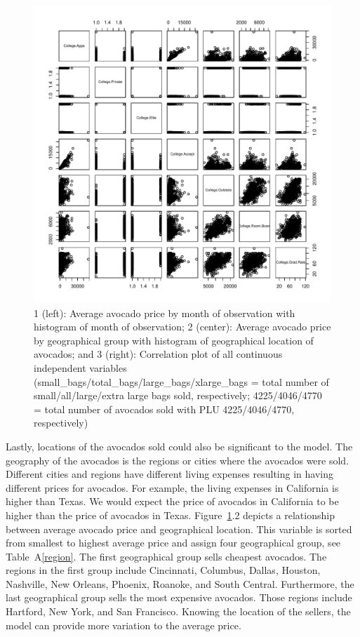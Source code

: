 \documentclass[11pt]{article}\usepackage[]{graphicx}\usepackage[]{color}
\makeatletter
\def\maxwidth{ %
  \ifdim\Gin@nat@width>\linewidth
    \linewidth
  \else
    \Gin@nat@width
  \fi
}
\makeatother
\begin{document}
\begin{figure}[h!] 
\begin{center}

\includegraphics[width=\maxwidth]{figure/unnamed-chunk-2-1} 

\caption{1 (left): Average avocado price by month of observation with histogram of month of observation; 2 (center): Average avocado price by geographical group with histogram of geographical location of avocados; and 3 (right): Correlation plot of all continuous independent variables (small\_bags/total\_bags/large\_bags/xlarge\_bags = total number of small/all/large/extra large bags sold, respectively; 4225/4046/4770 = total number of avocados sold with PLU 4225/4046/4770, respectively)}
\label{explore2}
\end{center} 
\end{figure}

\noindent Lastly, locations of the avocados sold could also be significant to the model. The geography of the avocados is the regions or cities where the avocados were sold. Different cities and regions have different living expenses resulting in having different prices for avocados. For example, the living expenses in California is higher than Texas. We would expect the price of avocados in California to be higher than the price of avocados in Texas. Figure~\ref{explore2}.2 depicts a relationship between average avocado price and geographical location. This variable is sorted from smallest to highest average price and assign four geographical group, see Table~A\ref{region}. The first geographical group sells cheapest avocados. The regions in the first group include Cincinnati, Columbus, Dallas, Houston, Nashville, New Orleans, Phoenix, Roanoke, and South Central. Furthermore, the last geographical group sells the most expensive avocados. Those regions include Hartford, New York, and San Francisco. Knowing the location of the sellers, the model can provide more variation to the average price.        
\hfill \break
\end{document}
